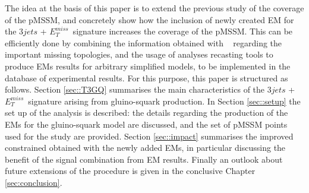 \documentclass[epj,nopacs,fleqn]{svjour}
\newcommand{\MET}{{ $E_T ^{miss}$}}
\begin{document}
The idea at the basis of this paper is to extend the previous study of the coverage of the pMSSM, and concretely show how the inclusion of newly created EM for the $3jets$ + \MET~signature increases the coverage of the pMSSM. This can be efficiently done by combining the information obtained with \SMO~ regarding the important missing topologies, and the usage of analyses recasting tools to produce EMs results for arbitrary simplified models, to be implemented in the database of experimental results. For this purpose, this paper is structured as follows. Section \ref{sec::T3GQ} summarises the main characteristics of the $3jets$ + \MET~signature arising from gluino-squark production. In Section \ref{sec::setup} the set up of the \SMO analysis is described: the details regarding the production of the EMs for the gluino-squark model are discussed, and the set of pMSSM points used for the study are provided. Section \ref{sec::impact} summarises the improved constrained obtained with the newly added EMs, in particular discussing the benefit of the signal combination from EM results. Finally an outlook about future extensions of the procedure is given in the conclusive Chapter \ref{sec:conclusion}.  
%
\end{document}
